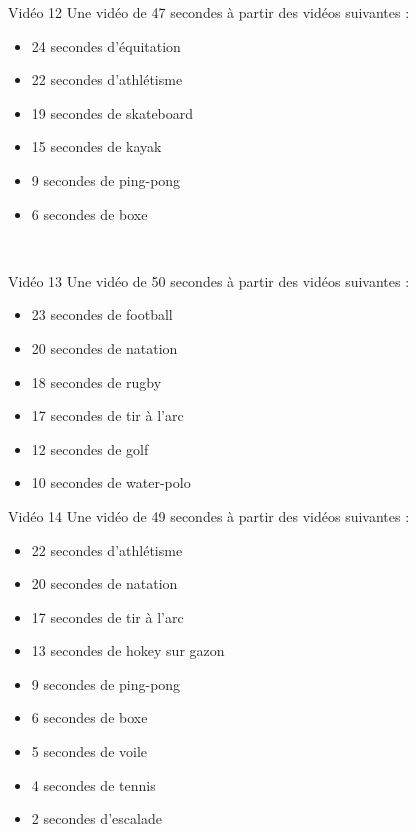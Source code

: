 \documentclass[10pt, a5paper,twoside]{article}
\begin{document}
\vfill

\begin{card}[width = \textwidth, colback = olympicgreen, colframe = olympicgreen, bottomtitle = 2mm]{Vidéo 12}
  Une vidéo de 47 secondes à partir des vidéos suivantes :
  \vspace{-1mm}\begin{itemize}
    \item 24 secondes d'équitation
    \item 22 secondes d'athlétisme
    \item 19 secondes de skateboard
    \item 15 secondes de kayak
    \item 9 secondes de ping-pong
    \item 6 secondes de boxe
  \end{itemize}
\end{card}

\vfill

\clearpage
~
\vfill

\begin{card}[width = \textwidth, colback = olympicgreen, colframe = olympicgreen, bottomtitle = 2mm]{Vidéo 13}
  Une vidéo de 50 secondes à partir des vidéos suivantes :
  \vspace{-1mm}\begin{itemize}
    \item 23 secondes de football
    \item 20 secondes de natation
    \item 18 secondes de rugby
    \item 17 secondes de tir à l'arc
    \item 12 secondes de golf
    \item 10 secondes de water-polo
  \end{itemize}
\end{card}

\vfill

\begin{card}[width = \textwidth, colback = olympicgreen, colframe = olympicgreen, bottomtitle = 2mm]{Vidéo 14}
  Une vidéo de 49 secondes à partir des vidéos suivantes :
  \vspace{-1mm}\begin{itemize}
    \item 22 secondes d'athlétisme
    \item 20 secondes de natation
    \item 17 secondes de tir à l'arc
    \item 13 secondes de hokey sur gazon
    \item 9 secondes de ping-pong
    \item 6 secondes de boxe
    \item 5 secondes de voile
    \item 4 secondes de tennis
    \item 2 secondes d'escalade
  \end{itemize}
\end{card}
\end{document}
